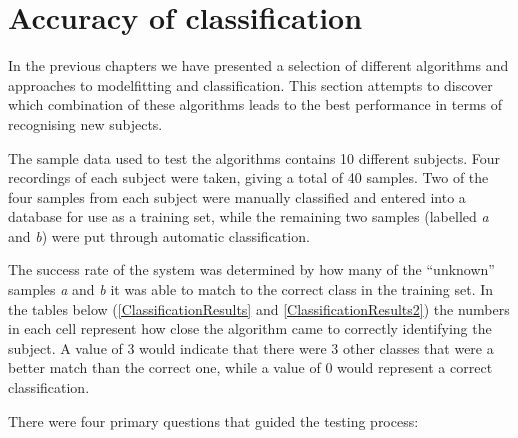 \section{Accuracy of classification}
\label{Results:Classification}

In the previous chapters we have presented a selection of different algorithms and approaches to modelfitting and classification.
This section attempts to discover which combination of these algorithms leads to the best performance in terms of recognising new subjects.

The sample data used to test the algorithms contains 10 different subjects.
Four recordings of each subject were taken, giving a total of 40 samples.
Two of the four samples from each subject were manually classified and entered into a database for use as a training set,
while the remaining two samples (labelled \emph{a} and \emph{b}) were put through automatic classification.

The success rate of the system was determined by how many of the ``unknown'' samples \emph{a} and \emph{b} it was able to match to the correct class in the training set.
In the tables below (\ref{ClassificationResults} and \ref{ClassificationResults2}) the numbers in each cell represent how close the algorithm came to correctly identifying the subject.
A value of 3 would indicate that there were 3 other classes that were a better match than the correct one,
while a value of 0 would represent a correct classification.

\bigskip
\noindent There were four primary questions that guided the testing process:


